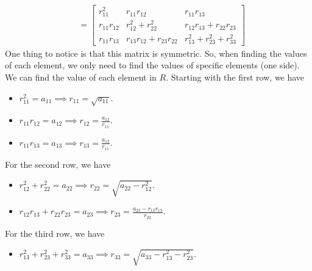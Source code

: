 \documentclass[letterpaper]{article}
\newcommand{\0}{\mathbf{0}}
\begin{document}
\begin{mdframed}
\begin{equation*}
\begin{aligned}
                &= \begin{bmatrix}
                    r_{11}^2 & r_{11}r_{12} & r_{11}r_{13} \\ 
                    r_{11}r_{12} & r_{12}^2 + r_{22}^2 & r_{12}r_{13} + r_{22} r_{23} \\ 
                    r_{11}r_{13} & r_{13}r_{12} + r_{23}r_{22} & r_{13}^2 + r_{23}^2 + r_{33}^2
                \end{bmatrix}
        \end{aligned}
    \end{equation*}
    One thing to notice is that this matrix is symmetric. So, when finding the values of each element, we only need to find the values of specific elements (one side). We can find the value of each element in $R$. Starting with the first row, we have 
    \begin{itemize}
        \item $r_{11}^2 = a_{11} \implies \boxed{r_{11} = \sqrt{a_{11}}}$.
        \item $r_{11}r_{12} = a_{12} \implies \boxed{r_{12} = \frac{a_{12}}{r_{11}}}$. 
        \item $r_{11}r_{13} = a_{13} \implies \boxed{r_{13} = \frac{a_{13}}{r_{11}}}$.
    \end{itemize}
    For the second row, we have 
    \begin{itemize}
        \item $r_{12}^2 + r_{22}^2 = a_{22} \implies \boxed{r_{22} = \sqrt{a_{22} - r_{12}^2}}$. 
        \item $r_{12}r_{13} + r_{22}r_{23} = a_{23} \implies \boxed{r_{23} = \frac{a_{23} - r_{12}r_{13}}{r_{22}}}$. 
    \end{itemize}
    For the third row, we have 
    \begin{itemize}
        \item $r_{13}^2 + r_{23}^2 + r_{33}^2 = a_{33} \implies \boxed{r_{33} = \sqrt{a_{33} - r_{13}^2 - r_{23}^2}}$. 
    \end{itemize}
\end{mdframed}
\end{document}
